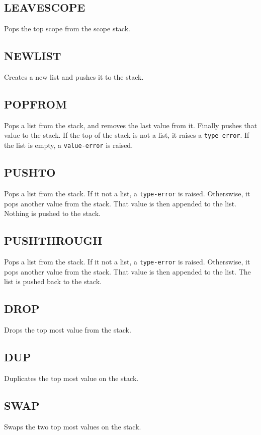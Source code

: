 \subsection{LEAVE\textunderscore{}SCOPE}
\label{sec:leavescope}
Pops the top scope from the scope stack.

\subsection{NEW\textunderscore{}LIST}
\label{sec:newlist}
Creates a new list and pushes it to the stack.

\subsection{POP\textunderscore{}FROM}
\label{sec:popfrom}
Pops a list from the stack, and removes the last value from it. Finally
pushes that value to the stack. If the top of the stack is not a list,
it raises a \verb!type-error!. If the list is empty, a
\verb!value-error! is raised.

\subsection{PUSH\textunderscore{}TO}
\label{sec:pushto}
Pops a list from the stack. If it not a list, a \verb!type-error! is
raised. Otherswise, it pops another value from the stack. That value
is then appended to the list. Nothing is pushed to the stack.

\subsection{PUSH\textunderscore{}THROUGH}
\label{sec:pushthrough}
Pops a list from the stack. If it not a list, a \verb!type-error! is
raised. Otherswise, it pops another value from the stack. That value
is then appended to the list. The list is pushed back to the stack.

\subsection{DROP}
\label{sec:drop}
Drops the top most value from the stack.

\subsection{DUP}
\label{sec:dup}
Duplicates the top most value on the stack.

\subsection{SWAP}
\label{sec:swap}
Swaps the two top most values on the stack.

